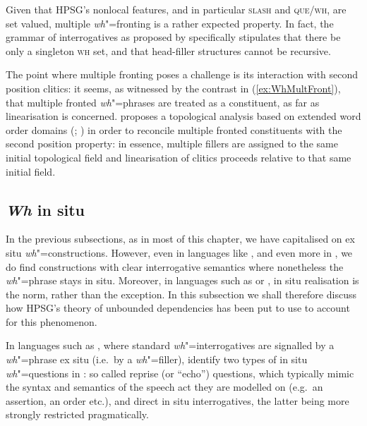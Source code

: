 \documentclass[output=paper,biblatex,babelshorthands,newtxmath,draftmode,colorlinks,citecolor=brown]{langscibook}
\begin{document}
\noindent
Given that HPSG's nonlocal features, and in particular \textsc{slash}
and \textsc{que}/\textsc{wh}, are set valued, multiple \emph{wh}"=fronting is a
rather expected property. In fact, the grammar of 
interrogatives as proposed by \citet{Ginzburg:Sag:01} specifically
stipulates that there be only a singleton \textsc{wh} set, and that
head-filler structures cannot be recursive.

The point where  multiple fronting poses a challenge is its
interaction with second position clitics: it seems, as witnessed by
the contrast in (\ref{ex:WhMultFront}), that multiple fronted
\emph{wh}"=phrases are treated as a constituent, as far as
linearisation is concerned. \citet{Penn:99} proposes a topological
analysis based on extended word order domains
(\citealt{Reape:90,Reape94a,kathol_a00}{; }) in order to reconcile multiple fronted
constituents with the second position property: in essence, multiple
fillers are assigned to the same initial topological field and
linearisation of clitics proceeds relative to that same initial field.


\subsection{\emph{Wh} in situ}
\label{sec:UDC:WhInSitu}

In the previous subsections, as in most of this chapter, we have
capitalised on ex situ \emph{wh}"=constructions. However, even in
languages like , and even more in , we do find
constructions with clear interrogative semantics where nonetheless the
\emph{wh}"=phrase stays in situ. Moreover, in languages such as
 or  , in situ realisation is the norm, rather
than the exception. In this subsection we shall therefore discuss how
HPSG's theory of unbounded dependencies has been put to use to account
for this phenomenon.

In languages such as , where standard \emph{wh}"=interrogatives
are signalled by a \emph{wh}"=phrase ex situ (i.e.\ by a
\emph{wh}"=filler), \citet[Chapter~7]{Ginzburg:Sag:01} identify two types of in
situ \emph{wh}"=questions in : so called reprise (or ``echo'')
questions, which typically mimic the syntax and semantics of the
speech act they are modelled on (e.g.\ an assertion, an order etc.),
and direct in situ interrogatives, the latter being more strongly
restricted
pragmatically. %
\end{document}
